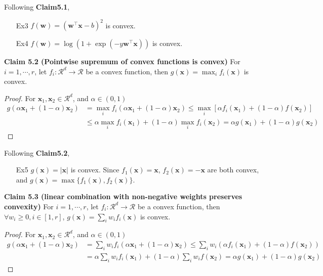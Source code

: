 \documentclass{article}
\newtheorem*{proof}{Proof}
\begin{document}
	Following \textbf{Claim5.1}, 
	\begin{itemize}
	\item[Ex3] $f(\mathbf{w})=(\mathbf{w}^\top \mathbf{x} - b)^2$ is convex.
	\item[Ex4] $f(\mathbf{w})=\log(1+\exp(-y\mathbf{w}^\top \mathbf{x}))$ is convex.
	\end{itemize}
	
	\textbf{Claim 5.2 (Pointwise supremum of convex functions is convex)} For $i = 1,\cdots, r$, let $f_i: \mathcal{R}^d \rightarrow \mathcal{R}$ be a convex function, then $g(\mathbf{x})=\max_i f_i(\mathbf{x})$ is convex.
	
	\begin{proof}
	For $\mathbf{x}_1, \mathbf{x}_2 \in \mathcal{R}^d$, and $\alpha \in (0,1)$
	\begin{equation*}
	\begin{split}
	g(\alpha\mathbf{x}_1+(1-\alpha)\mathbf{x}_2) &= \max_i f_i(\alpha \mathbf{x}_1 + (1-\alpha) \mathbf{x}_2)  \leq  \max_i [\alpha f_i( \mathbf{x}_1) + (1-\alpha) f(\mathbf{x}_2)] \\ &\leq   \alpha \max_i f_i(\mathbf{x}_1) + (1-\alpha) \max_i f_i(\mathbf{x}_2) = \alpha g(\mathbf{x}_1) + (1-\alpha) g(\mathbf{x}_2)
	\end{split}
	\end{equation*}
	\end{proof}
	
	Following \textbf{Claim5.2}, 
	\begin{itemize}
	\item[Ex5] $g(\mathbf{x})=|\mathbf{x}|$ is convex. Since $f_1(\mathbf{x})=\mathbf{x}$, $f_2(\mathbf{x})=-\mathbf{x}$ are both convex, and $g(\mathbf{x})=\max\{f_1(\mathbf{x}), f_2(\mathbf{x})\}$.
	\end{itemize}
	
	\textbf{Claim 5.3 (linear combination with non-negative weights preserves convexity)} For $i = 1,\cdots, r$, let $f_i: \mathcal{R}^d \rightarrow \mathcal{R}$ be a convex function, then $\forall w_i\geq 0, i\in[1,r]$, $g(\mathbf{x})=\sum_i w_i f_i(\mathbf{x})$ is convex.
	
	\begin{proof}
	For $\mathbf{x}_1, \mathbf{x}_2 \in \mathcal{R}^d$, and $\alpha \in (0,1)$
	\begin{equation*}
	\begin{split}
	g(\alpha\mathbf{x}_1+(1-\alpha)\mathbf{x}_2) &= \sum_i w_i f_i(\alpha \mathbf{x}_1 + (1-\alpha) \mathbf{x}_2)  \leq  \sum_i w_i(\alpha f_i( \mathbf{x}_1) + (1-\alpha) f(\mathbf{x}_2)) \\ &=   \alpha \sum_i w_i f_i(\mathbf{x}_1) + (1-\alpha) \sum_i w_i f(\mathbf{x}_2) = \alpha g(\mathbf{x}_1) + (1-\alpha) g(\mathbf{x}_2)
	\end{split}
	\end{equation*}
	\end{proof}
\end{document}
